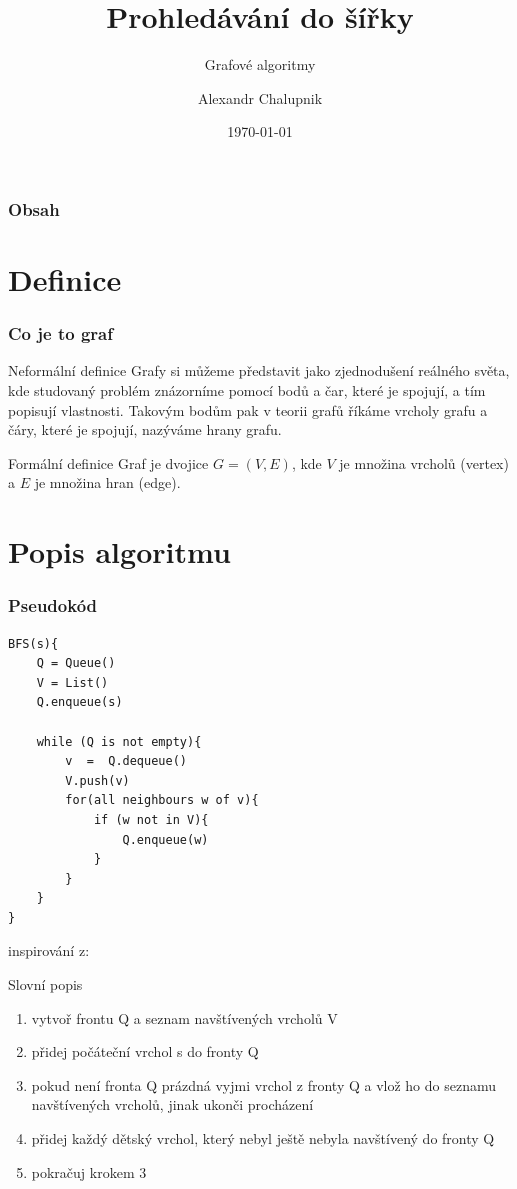 \documentclass[hyperref={unicode}]{beamer}
\title[ITY 5. projekt]{Prohledávání do šířky}
\subtitle{Grafové algoritmy}
\author{Alexandr Chalupnik}
\date{\today}
\begin{document}
\frame{\titlepage}

\begin{frame}
\frametitle{Obsah}
\tableofcontents
\end{frame}

\section{Definice}
\begin{frame}
\frametitle{Co je to graf}
\begin{block}{Neformální definice}
Grafy si můžeme představit jako zjednodušení reálného světa, kde studovaný problém znázorníme pomocí bodů a čar, které je spojují, a tím popisují vlastnosti. Takovým bodům pak v teorii grafů říkáme vrcholy grafu a čáry, které je spojují, nazýváme hrany grafu.\cite{definice:neformalni}
\end{block}
\begin{block}{Formální definice}
Graf \alert{je dvojice} $G = (V,E)$, kde $V$ je množina vrcholů (vertex) a $E$ je množina hran (edge).
\end{block}
\end{frame}

\section{Popis algoritmu}
\begin{frame}[fragile]
\frametitle{Pseudokód}
\begin{lstlisting}[basicstyle=\footnotesize\ttfamily,breaklines=true]
BFS(s){
    Q = Queue()
    V = List()
    Q.enqueue(s)
    
    while (Q is not empty){
        v  =  Q.dequeue()
        V.push(v)
        for(all neighbours w of v){
            if (w not in V){ 
                Q.enqueue(w)
            }
        }
    }
}
\end{lstlisting}
\scriptsize{inspirování z: \cite{pseudo}}
\end{frame}

\begin{frame}{Slovní popis}
\begin{enumerate}
  [default]
    \item vytvoř frontu Q a seznam navštívených vrcholů V
    \item přidej počáteční vrchol s do fronty Q
    \item pokud není fronta Q prázdná vyjmi vrchol z fronty Q a vlož ho do seznamu navštívených vrcholů, jinak ukonči procházení
    \item přidej každý dětský vrchol, který nebyl ještě nebyla navštívený do fronty Q
    \item pokračuj krokem 3
\end{enumerate}
\end{frame}
\end{document}
